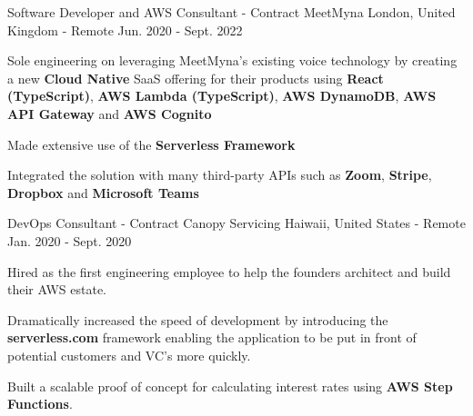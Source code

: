 \begin{cventries}
  \cventry
    {Software Developer and AWS Consultant - Contract} %
    {MeetMyna} %
    {London, United Kingdom - Remote} %
    {Jun. 2020 - Sept. 2022} %
    {
      \begin{cvitems} %
        \item {Sole engineering on leveraging MeetMyna's existing voice technology by creating a new \textbf{Cloud Native} SaaS offering for their products using \textbf{React (TypeScript)}, \textbf{AWS Lambda (TypeScript)}, \textbf{AWS DynamoDB}, \textbf{AWS API Gateway} and \textbf{AWS Cognito}}
        \item {Made extensive use of the \textbf{Serverless Framework}}
        \item {Integrated the solution with many third-party APIs such as \textbf{Zoom}, \textbf{Stripe}, \textbf{Dropbox} and \textbf{Microsoft Teams}}
      \end{cvitems}
    }

  \cventry
    {DevOps Consultant - Contract} %
    {Canopy Servicing} %
    {Haiwaii, United States - Remote} %
    {Jan. 2020 - Sept. 2020} %
    {
      \begin{cvitems} %
        \item {Hired as the first engineering employee to help the founders architect and build their AWS estate.}
        \item {Dramatically increased the speed of development by introducing the \textbf{serverless.com} framework enabling the application to be put in front of potential customers and VC's more quickly.}
        \item {Built a scalable proof of concept for calculating interest rates using \textbf{AWS Step Functions}.}
      \end{cvitems}
    }


\end{cventries}
